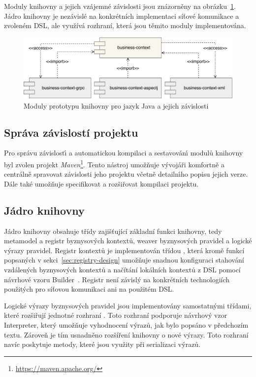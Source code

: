 Moduly knihovny a jejich vzájemné závislosti jsou znázorněny na obrázku~\ref{fig:modules}.
Jádro knihovny je nezávislé na konkrétních implementaci síťové komunikace a zvoleném
\gls{DSL}, ale využívá rozhraní, která jsou těmito moduly implementována.

\begin{figure}
    \centering
    \includegraphics[keepaspectratio=true, width=1\linewidth]{figures/library-modules.pdf}
    \caption{Moduly prototypu knihovny pro jazyk Java a jejich závislosti}
    \label{fig:modules}
\end{figure}

\subsection{Správa závislostí projektu}

Pro správu závislost\'{\i} a automatickou kompilaci a sestavován\'{\i} modulů knihovny byl zvolen
projekt \textit{Maven}\footnote{\url{https://maven.apache.org/}}.
Tento nástroj umožňuje v\'yvojáři komfortně a centrálně spravovat závislosti jeho projektu včetně
detailn\'{\i}ho popisu jejich verze. Dále také umožňuje specifikovat a rozšiřovat kompilaci projektu.

\subsection{Jádro knihovny}

Jádro knihovny obsahuje třídy zajišťující základní funkci knihovny, tedy metamodel a registr
byznysových kontextů, weaver byznysových pravidel a logické výrazy pravidel. Registr kontextů
je implementován třídou , která kromě funkcí popsaných v
sekci~\ref{sec:registry-design} umožňuje snadnou konfiguraci
stahování vzdálených byznysových kontextů a načítání lokálních kontextů z \gls{DSL} pomocí
návrhové vzoru Builder~\cite{fowler2002patterns}. Registr není závislý na konkrétních
technologiích použitých pro síťovou komunikaci ani na použitém \gls{DSL}.

Logické výrazy byznysových pravidel jsou implementovány samostatnými třídami, které rozšiřují
jednotné rozhraní . Toto rozhraní podporuje návrhový vzor Interpreter, který umožňuje
vyhodnocení výrazů, jak bylo popsáno v předchozím textu. Zároveň je tím usnadněno rozšíření knihovny o
nové výrazy. Toto rozhraní navíc poskytuje metody, které jsou využity při serializaci výrazů.

